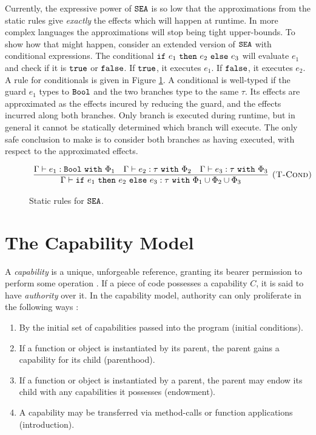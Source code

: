 Currently, the expressive power of $\mathtt{SEA}$ is so low that the approximations from the static rules give \textit{exactly} the effects which will happen at runtime. In more complex languages the approximations will stop being tight upper-bounds. To show how that might happen, consider an extended version of $\mathtt{SEA}$ with conditional expressions. The conditional $\mathtt{if}~ e_1~ \mathtt{then}~ e_2~\mathtt{else}~ e_3$ will evaluate $e_1$ and check if it is $\mathtt{true}$ or $\mathtt{false}$. If $\mathtt{true}$, it executes $e_1$. If $\mathtt{false}$, it executes $e_2$. A rule for conditionals is given in Figure \ref{fig:fxtute_cond_rule}. A conditional is well-typed if the guard $e_1$ types to $\mathtt{Bool}$ and the two branches type to the same $\tau$. Its effects are approximated as the effects incured by reducing the guard, and the effects incurred along both branches. Only branch is executed during runtime, but in general it cannot be statically determined which branch will execute. The only safe conclusion to make is to consider both branches as having executed, with respect to the approximated effects.


\begin{figure}[h]


\[
\begin{array}{c}

\infer[\textsc{(T-Cond)}]
	{ \Gamma \vdash \cond{e_1}{e_2}{e_3}: \tau~\kw{with} \Phi_1 \cup \Phi_2 \cup \Phi_3 }
	{ \Gamma \vdash e_1: \Bool~\kw{with} \Phi_1 & \Gamma \vdash e_2: \tau~\kw{with} \Phi_2 & \Gamma \vdash e_3: \tau~\kw{with} \Phi_3 }
	
\end{array}
\]

\vspace{-12pt}
\caption{Static rules for $\mathtt{SEA}$.}
\label{fig:fxtute_cond_rule}
\end{figure}

\section{The Capability Model}

A \textit{capability} is a unique, unforgeable reference, granting its bearer permission to perform some operation \cite{dennis66}. If a piece of code possesses a capability $C$, it is said to have \textit{authority} over it. In the capability model, authority can only proliferate in the following ways \cite{miller06}:

\begin{enumerate}
	\item By the initial set of capabilities passed into the program (initial conditions).
	\item If a function or object is instantiated by its parent, the parent gains a capability for its child (parenthood).
	\item If a function or object is instantiated by a parent, the parent may endow its child with any capabilities it possesses (endowment).
	\item A capability may be transferred via method-calls or function applications (introduction).
\end{enumerate}

